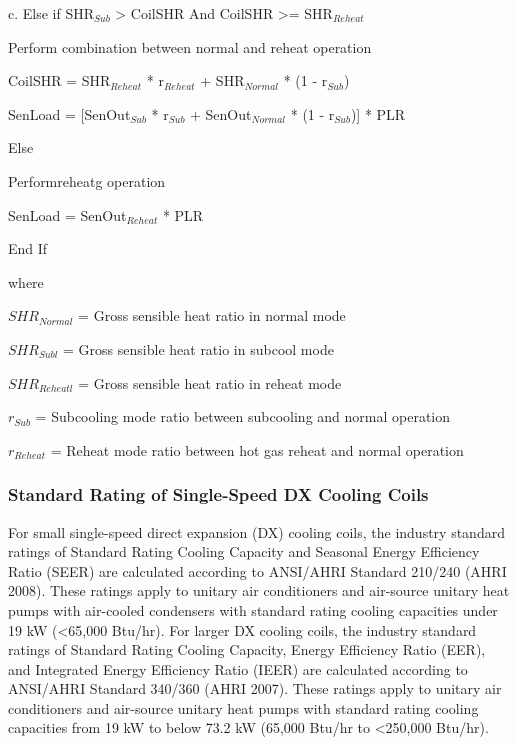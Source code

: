 c.  Else if SHR\(_{Sub}\) > CoilSHR And CoilSHR >= SHR\(_{Reheat}\)

   Perform combination between normal and reheat operation

  CoilSHR = SHR\(_{Reheat}\) * r\(_{Reheat}\) + SHR\(_{Normal}\) * (1 - r\(_{Sub}\))

  SenLoad = [SenOut\(_{Sub}\) * r\(_{Sub}\) + SenOut\(_{Normal}\) * (1 - r\(_{Sub}\))] * PLR

Else

    Performreheatg operation

    SenLoad = SenOut\(_{Reheat}\) * PLR

End If

where
 
\(SHR_{Normal}\) = Gross sensible heat ratio in normal mode

\(SHR_{Subl}\) = Gross sensible heat ratio in subcool mode

\(SHR_{Reheatl}\) = Gross sensible heat ratio in reheat mode

\(r_{Sub}\) = Subcooling mode ratio between subcooling and normal operation

\(r_{Reheat}\) = Reheat mode ratio between hot gas reheat and normal operation

\subsubsection{Standard Rating of Single-Speed DX Cooling Coils}\label{standard-rating-of-single-speed-dx-cooling-coils}

For small single-speed direct expansion (DX) cooling coils, the industry standard ratings of Standard Rating Cooling Capacity and Seasonal Energy Efficiency Ratio (SEER) are calculated according to ANSI/AHRI Standard 210/240 (AHRI 2008). These ratings apply to unitary air conditioners and air-source unitary heat pumps with air-cooled condensers with standard rating cooling capacities under 19 kW (\textless{}65,000 Btu/hr). For larger DX cooling coils, the industry standard ratings of Standard Rating Cooling Capacity, Energy Efficiency Ratio (EER), and Integrated Energy Efficiency Ratio (IEER) are calculated according to ANSI/AHRI Standard 340/360 (AHRI 2007). These ratings apply to unitary air conditioners and air-source unitary heat pumps with standard rating cooling capacities from 19 kW to below 73.2 kW (65,000 Btu/hr to \textless{}250,000 Btu/hr).

